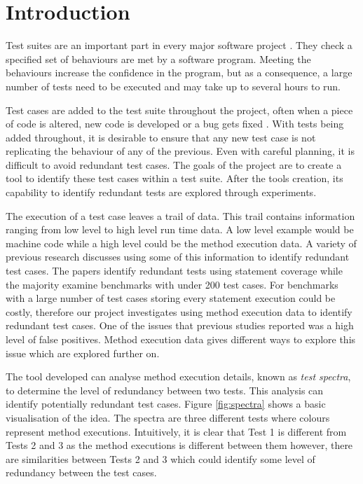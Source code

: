 \chapter{Introduction}\label{C:intro}

Test suites are an important part in every major software project \cite{jeffrey2005test}. They check a specified set of behaviours are met by a software program. Meeting the behaviours increase the confidence in the program, but as a consequence, a large number of tests need to be executed and may take up to several hours to run.

Test cases are added to the test suite throughout the project, often when a piece of code is altered, new code is developed or a bug gets fixed \cite{issuetrack,whentotest}. With tests being added throughout, it is desirable to ensure that any new test case is not replicating the behaviour of any of the previous. Even with careful planning, it is difficult to avoid redundant test cases. The goals of the project are to create a tool to identify these test cases within a test suite. After the tools creation, its capability to identify redundant tests are explored through experiments.


The execution of a test case leaves a trail of data. This trail contains information ranging from low level to high level run time data. A low level example would be machine code while a high level could be the method execution data. A variety of previous research \cite{wong1995effect, wong1999test, rothermel1998empirical, rothermel2002empirical,koochakzadeh2009test,zhang2011empirical,li2008static} discusses using some of this information to identify redundant test cases. The papers identify redundant tests using statement coverage while the majority examine benchmarks with under 200 test cases. For benchmarks with a large number of test cases storing every statement execution could be costly, therefore our project investigates using method execution data to identify redundant test cases. One of the issues that previous studies reported was a high level of false positives. Method execution data gives different ways to explore this issue which are explored further on. 

The tool developed can analyse method execution details, known as \textit{test spectra}, to determine the level of redundancy between two tests. This analysis can identify potentially redundant test cases. Figure \ref{fig:spectra} shows a basic visualisation of the idea. The spectra are three different tests where colours represent method executions. Intuitively, it is clear that Test 1 is different from Tests 2 and 3 as the method executions is different between them however, there are similarities between Tests 2 and 3 which could identify some level of redundancy between the test cases. 

